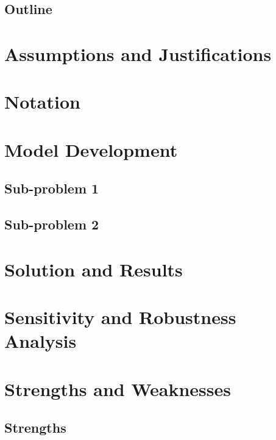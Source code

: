\documentclass[11pt,letterpaper]{article}
\begin{document}
\subsection{Outline}

\section{Assumptions and Justifications}


\section{Notation}


\section{Model Development}


\subsection{Sub-problem 1}

\subsection{Sub-problem 2}

\section{Solution and Results}


\section{Sensitivity and Robustness Analysis}


\section{Strengths and Weaknesses}

\subsection{Strengths}
\end{document}
